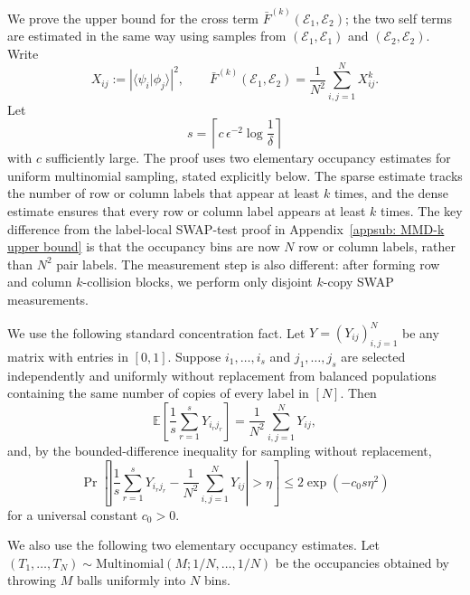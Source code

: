 \documentclass[aps,prx,reprint,superscriptaddress,amsmath,amssymb,longbibliography,floatfix]{revtex4-2}
\newcommand{\Abs}[1]{\left\lvert #1\right\rvert}
\providecommand{\braket}[2]{\langle #1|#2 \rangle}
\newcommand{\dsE}{\mathbb{E}}
\newcommand{\scE}{\mathcal{E}}
\theoremstyle{plain}
\theoremstyle{definition}
\theoremstyle{remark}
\begin{document}
We prove the upper bound for the cross term $\bar F^{(k)}(\scE_1,\scE_2)$; the two self terms are estimated in the same way using samples from $(\scE_1,\scE_1)$ and $(\scE_2,\scE_2)$. Write
$$
X_{ij}:=\Abs{\braket{\psi_i}{\phi_j}}^2,\qquad
\bar F^{(k)}(\scE_1,\scE_2)=\frac1{N^2}\sum_{i,j=1}^N X_{ij}^k.
$$
Let
$$
s=\left\lceil c\,\epsilon^{-2}\log\frac1\delta\right\rceil
$$
with $c$ sufficiently large. The proof uses two elementary occupancy estimates for uniform multinomial sampling, stated explicitly below. The sparse estimate tracks the number of row or column labels that appear at least $k$ times, and the dense estimate ensures that every row or column label appears at least $k$ times. The key difference from the label-local SWAP-test proof in Appendix~\ref{appsub: MMD-k upper bound} is that the occupancy bins are now $N$ row or column labels, rather than $N^2$ pair labels. The measurement step is also different: after forming row and column $k$-collision blocks, we perform only disjoint $k$-copy SWAP measurements.

We use the following standard concentration fact. Let $Y=(Y_{ij})_{i,j=1}^N$ be any matrix with entries in $[0,1]$. Suppose $i_1,\ldots,i_s$ and $j_1,\ldots,j_s$ are selected independently and uniformly without replacement from balanced populations containing the same number of copies of every label in $[N]$. Then
$$
\dsE\left[\frac1s\sum_{r=1}^s Y_{i_rj_r}\right]=\frac1{N^2}\sum_{i,j=1}^N Y_{ij},
$$
and, by the bounded-difference inequality for sampling without replacement,
\begin{equation}
\Pr\!\left[
\Abs{\frac1s\sum_{r=1}^s Y_{i_rj_r}-\frac1{N^2}\sum_{i,j=1}^N Y_{ij}}>\eta
\right]\le 2\exp(-c_0s\eta^2)
\label{eq:app-balanced-label-concentration}
\end{equation}
for a universal constant $c_0>0$.

We also use the following two elementary occupancy estimates. Let
$(T_1,\ldots,T_N)\sim\mathrm{Multinomial}(M;1/N,\ldots,1/N)$ be the occupancies obtained by throwing $M$ balls uniformly into $N$ bins.
\end{document}
